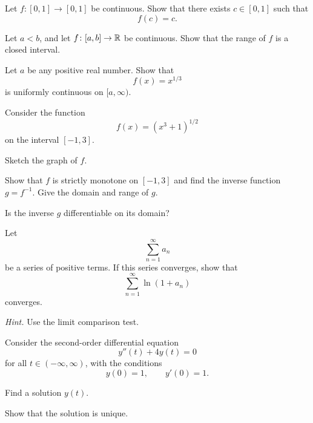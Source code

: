 \begin{problem}
Let $f\colon[0, 1]\to[0, 1]$ be continuous. Show that there exists $c\in[0, 1]$ such that
\[
f(c)=c.
\]
\end{problem}

\begin{problem}
Let $a<b$, and let $f\colon[a, b]\to\mathbb{R}$ be continuous. Show that the range of $f$ is a closed interval.
\end{problem}

\begin{problem}
Let $a$ be any positive real number. Show that
\[
f(x)=x^{1/3}
\]
is uniformly continuous on $[a, \infty)$.
\end{problem}

\begin{problem}
Consider the function
\[
f(x)=(x^3+1)^{1/2}
\]
on the interval $[-1, 3]$.
\begin{problemsubparts}
\item Sketch the graph of $f$.
\item Show that $f$ is strictly monotone on $[-1, 3]$ and find the inverse function $g=f^{-1}$. Give the domain and range of $g$.
\item Is the inverse $g$ differentiable on its domain?
\end{problemsubparts}
\end{problem}

\begin{problem}
Let
\[
\sum_{n=1}^{\infty}a_n
\]
be a series of positive terms. If this series converges, show that
\[
\sum_{n=1}^{\infty}\ln(1+a_n)
\]
converges.

\textit{Hint.} Use the limit comparison test.
\end{problem}

\begin{problem}
Consider the second-order differential equation
\[
y''(t)+4y(t)=0
\]
for all $t\in(-\infty, \infty)$, with the conditions
\[
y(0)=1,
\qquad
y'(0)=1.
\]
\begin{problemsubparts}
\item Find a solution $y(t)$.
\item Show that the solution is unique.
\end{problemsubparts}
\end{problem}

